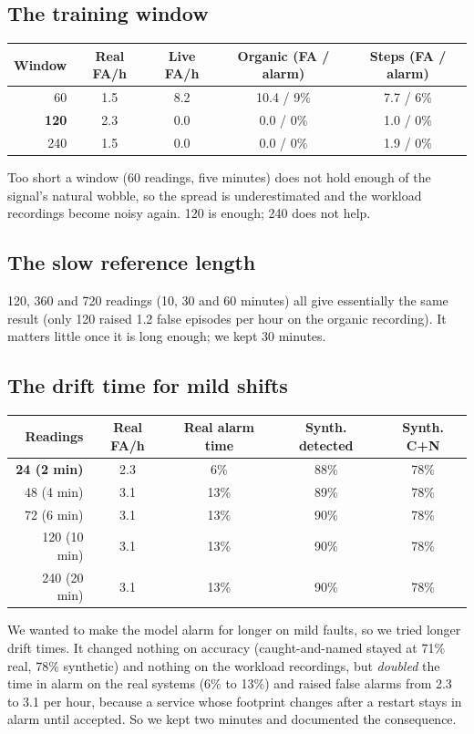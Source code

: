 \subsection{The training window}
\begin{center}
\small
\begin{tabular}{rcccc}
\toprule
Window & Real FA/h & Live FA/h & Organic (FA / alarm) & Steps (FA / alarm)\\
\midrule
60 & 1.5 & 8.2 & 10.4 / 9\% & 7.7 / 6\%\\
\textbf{120} & 2.3 & 0.0 & 0.0 / 0\% & 1.0 / 0\%\\
240 & 1.5 & 0.0 & 0.0 / 0\% & 1.9 / 0\%\\
\bottomrule
\end{tabular}
\end{center}
\begin{simplebox}
Too short a window (60 readings, five minutes) does not hold enough of the signal's natural wobble, so the spread is underestimated and the workload recordings become noisy again. 120 is enough; 240 does not help.
\end{simplebox}

\subsection{The slow reference length}
\begin{simplebox}
120, 360 and 720 readings (10, 30 and 60 minutes) all give essentially the same result (only 120 raised 1.2 false episodes per hour on the organic recording). It matters little once it is long enough; we kept 30 minutes.
\end{simplebox}

\subsection{The drift time for mild shifts}
\begin{center}
\small
\begin{tabular}{rcccc}
\toprule
Readings & Real FA/h & Real alarm time & Synth. detected & Synth. C+N\\
\midrule
\textbf{24 (2 min)} & 2.3 & 6\% & 88\% & 78\%\\
48 (4 min) & 3.1 & 13\% & 89\% & 78\%\\
72 (6 min) & 3.1 & 13\% & 90\% & 78\%\\
120 (10 min) & 3.1 & 13\% & 90\% & 78\%\\
240 (20 min) & 3.1 & 13\% & 90\% & 78\%\\
\bottomrule
\end{tabular}
\end{center}
\begin{simplebox}
We wanted to make the model alarm for longer on mild faults, so we tried longer drift times. It changed nothing on accuracy (caught-and-named stayed at 71\% real, 78\% synthetic) and nothing on the workload recordings, but \emph{doubled} the time in alarm on the real systems (6\% to 13\%) and raised false alarms from 2.3 to 3.1 per hour, because a service whose footprint changes after a restart stays in alarm until accepted. So we kept two minutes and documented the consequence.
\end{simplebox}

